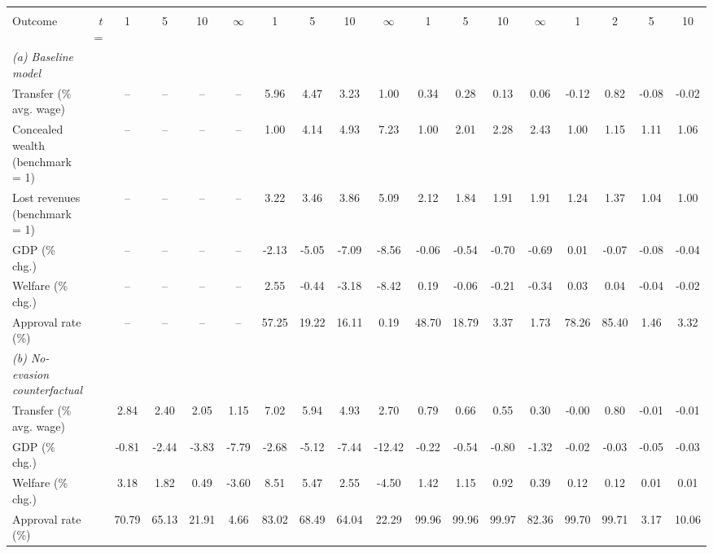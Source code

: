 \footnotesize
\renewcommand{\arraystretch}{1.2}
\begin{tabular}{lrcccccccccccccccc}
\toprule
& & &  &  & \\
\cmidrule(rl){3-6}\cmidrule(rl){7-10}\cmidrule(rl){11-14}\cmidrule(rl){15-18}
Outcome & $t$ = & 1 & 5 & 10 & $\infty$& 1 & 5 & 10 & $\infty$& 1 & 5 & 10 & $\infty$& 1 & 2 & 5 & 10\\
\midrule
\textit{(a) Baseline model}&&&&&&&&&&&&&&&&&\\
Transfer (\% avg. wage) & &--&--&--&--&5.96&4.47&3.23&1.00&0.34&0.28&0.13&0.06&-0.12&0.82&-0.08&-0.02\\
Concealed wealth (benchmark = 1) & &--&--&--&--&1.00&4.14&4.93&7.23&1.00&2.01&2.28&2.43&1.00&1.15&1.11&1.06\\
Lost revenues (benchmark = 1) & &--&--&--&--&3.22&3.46&3.86&5.09&2.12&1.84&1.91&1.91&1.24&1.37&1.04&1.00\\
GDP (\% chg.) & &--&--&--&--&-2.13&-5.05&-7.09&-8.56&-0.06&-0.54&-0.70&-0.69&0.01&-0.07&-0.08&-0.04\\
Welfare (\% chg.) & &--&--&--&--&2.55&-0.44&-3.18&-8.42&0.19&-0.06&-0.21&-0.34&0.03&0.04&-0.04&-0.02\\
Approval rate (\%) & &--&--&--&--&57.25&19.22&16.11&0.19&48.70&18.79&3.37&1.73&78.26&85.40&1.46&3.32\\
\midrule
\textit{(b) No-evasion counterfactual}&&&&&&&&&&&&&&&&&\\
Transfer (\% avg. wage) & &2.84&2.40&2.05&1.15&7.02&5.94&4.93&2.70&0.79&0.66&0.55&0.30&-0.00&0.80&-0.01&-0.01\\
GDP (\% chg.) & &-0.81&-2.44&-3.83&-7.79&-2.68&-5.12&-7.44&-12.42&-0.22&-0.54&-0.80&-1.32&-0.02&-0.03&-0.05&-0.03\\
Welfare (\% chg.) & &3.18&1.82&0.49&-3.60&8.51&5.47&2.55&-4.50&1.42&1.15&0.92&0.39&0.12&0.12&0.01&0.01\\
Approval rate (\%) & &70.79&65.13&21.91&4.66&83.02&68.49&64.04&22.29&99.96&99.96&99.97&82.36&99.70&99.71&3.17&10.06\\
\bottomrule
\end{tabular}
\normalsize
